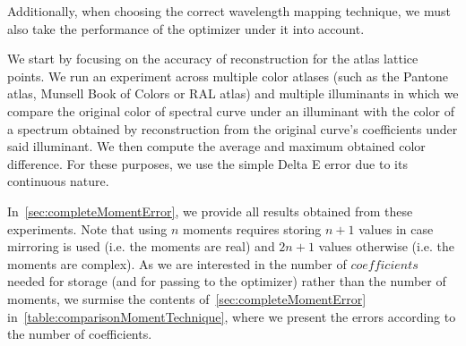 Additionally, when choosing the correct wavelength mapping technique, we must also take the performance of the optimizer under it into account.

We start by focusing on the accuracy of reconstruction for the atlas lattice points. We run an experiment across multiple color atlases (such as the Pantone atlas, Munsell Book of Colors or RAL atlas) and multiple illuminants in which we compare the original color of spectral curve under an illuminant with the color of a spectrum obtained by reconstruction from the original curve's coefficients under said illuminant. We then compute the average and maximum obtained color difference. For these purposes, we use the simple Delta E error due to its continuous nature.

In~\cref{sec:completeMomentError}, we provide all results obtained from these experiments. Note that using $n$ moments requires storing $n+1$ values in case mirroring is used (i.e. the moments are real) and $2n+1$ values otherwise (i.e. the moments are complex). As we are interested in the number of $coefficients$ needed for storage (and for passing to the optimizer) rather than the number of moments, we surmise the contents of~\cref{sec:completeMomentError} in~\cref{table:comparisonMomentTechnique}, where we present the errors according to the number of coefficients.

